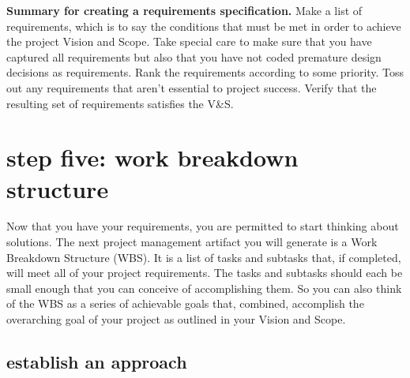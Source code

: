 \documentclass[12pt,oneside]{book}
\begin{document}
\hfill
\begin{mdframed}[everyline=true]
\textbf{Summary for creating a requirements specification.} Make a list of requirements, which is to say the conditions that must be met in order to achieve the project Vision and Scope. Take special care to make sure that you have captured all requirements but also that you have not coded premature design decisions as requirements. Rank the requirements according to some priority. Toss out any requirements that aren't essential to project success. Verify that the resulting set of requirements satisfies the V\&S.
\end{mdframed}

\newpage
{}
\section*{step five: work breakdown structure}

Now that you have your requirements, you are permitted to start thinking about solutions. The next project management artifact you will generate is a Work Breakdown Structure (WBS). It is a list of tasks and subtasks that, if completed, will meet all of your project requirements. The tasks and subtasks should each be small enough that you can conceive of accomplishing them. So you can also think of the WBS as a series of achievable goals that, combined, accomplish the overarching goal of your project as outlined in your Vision and Scope.

\subsection*{establish an approach}
\end{document}
